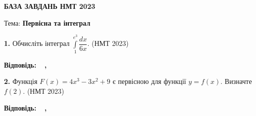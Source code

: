 \documentclass[14pt]{extarticle}
\newcommand{\answerBox}{
    \noindent
    \textbf{Відповідь:} \quad
    \begingroup
    \setlength{\fboxsep}{8pt}
    \framebox{\phantom{0}}\,\framebox{\phantom{0}}\,\framebox{\phantom{0}}\,\framebox{\phantom{0}}
    \textbf{,}
    \framebox{\phantom{0}}\,\framebox{\phantom{0}}\,\framebox{\phantom{0}}
    \endgroup
}
\newcommand{\nmtyear}[1]{\hfill{\small\color{yearcolor}(НМТ #1)}}
\begin{document}
\vspace{1cm}

\begin{center}
{\Large\textbf{\color{headerblue}БАЗА ЗАВДАНЬ НМТ 2023}}
\end{center}

\begin{center}
{\large Тема: \textbf{Первісна та інтеграл}}
\end{center}

\noindent\textbf{1.} Обчисліть інтеграл $\displaystyle\int\limits_1^{e^3} \dfrac{dx}{6x}$. \nmtyear{2023}

\vspace{0.5cm}
\answerBox

\vspace{1.0cm}

\noindent\textbf{2.} Функція $F(x) = 4x^3 - 3x^2 + 9$ є первісною для функції $y=f(x)$. Визначте $f(2)$. \nmtyear{2023}

\vspace{0.5cm}
\answerBox

\vspace{1.0cm}
\end{document}
